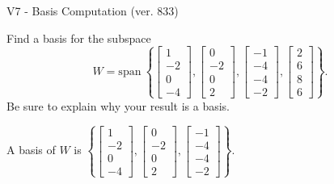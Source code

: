 \begin{exercise}
  \begin{exerciseTitle}V7 - Basis Computation (ver. 833)\end{exerciseTitle}
  \begin{exerciseStatement}
    Find a basis for the subspace 
\[W=\mathrm{span}\ \left\{\left[\begin{array}{r}
1 \\
-2 \\
0 \\
-4
\end{array}\right] , \left[\begin{array}{r}
0 \\
-2 \\
0 \\
2
\end{array}\right] , \left[\begin{array}{r}
-1 \\
-4 \\
-4 \\
-2
\end{array}\right] , \left[\begin{array}{r}
2 \\
6 \\
8 \\
6
\end{array}\right]\right\}.\]
 Be sure to explain why your result is a basis.


  \end{exerciseStatement}
  \begin{exerciseAnswer}
   A basis of \(W\) is  \(\left\{\left[\begin{array}{r}
1 \\
-2 \\
0 \\
-4
\end{array}\right] , \left[\begin{array}{r}
0 \\
-2 \\
0 \\
2
\end{array}\right] , \left[\begin{array}{r}
-1 \\
-4 \\
-4 \\
-2
\end{array}\right]\right\}\).
  


  \end{exerciseAnswer}
\end{exercise}